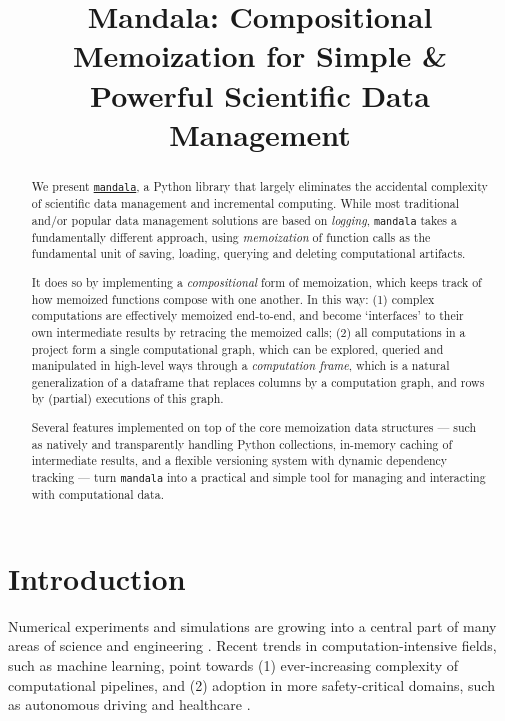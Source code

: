 \title[Mandala]{Mandala: Compositional Memoization for Simple & Powerful Scientific Data Management}

\begin{abstract}
  We present
  \href{https://github.com/amakelov/mandala}{\texttt{mandala}}, a Python
  library that largely eliminates the accidental complexity of scientific data
  management and incremental computing. While most traditional and/or
  popular data management solutions are based on \emph{logging},
  \texttt{mandala} takes a fundamentally different approach, using
  \emph{memoization} of function calls as the fundamental unit of saving,
  loading, querying and deleting computational artifacts.

  It does so by implementing a \emph{compositional} form of memoization, which keeps
  track of how memoized functions compose with one another. In this way: (1)
  complex computations are effectively memoized end-to-end, and become
  `interfaces' to their own intermediate results by retracing the memoized
  calls; (2) all computations in a project form a single computational graph,
  which can be explored, queried and manipulated in high-level ways through a
  \emph{computation frame}, which is a natural generalization of a dataframe that replaces columns by a computation graph, and rows by (partial) executions of this graph.

  Several features implemented on top of the core memoization data structures ---
  such as natively and transparently handling Python collections, in-memory caching of
  intermediate results, and a flexible versioning system with dynamic dependency
  tracking --- turn \texttt{mandala} into a practical and simple tool for
  managing and interacting with computational data.
\end{abstract}

\section{Introduction}
\label{section:intro}

Numerical experiments and simulations are growing into a central part of many
areas of science and engineering \citep{hey2009fourth}. Recent trends in
computation-intensive fields, such as machine learning, point towards (1)
ever-increasing complexity of computational pipelines, and (2) adoption in more
safety-critical domains, such as autonomous driving \citep{bojarski2016end} and
healthcare \citep{ravi2016deep,abramson2024accurate}.


